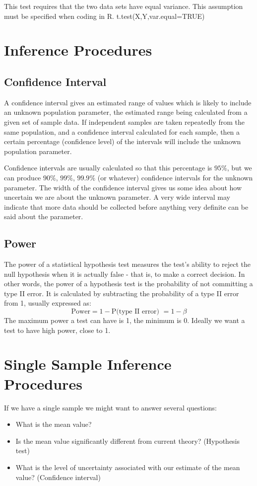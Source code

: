  
This test requires that the two data sets have equal variance. This assumption must be specified when coding in R.
t.test(X,Y,var.equal=TRUE)


 





\section{Inference Procedures}
\subsection{Confidence Interval }
A confidence interval gives an estimated range of values which is likely to include an unknown population parameter, the estimated range being calculated from a given set of sample data. If independent samples are taken repeatedly from the same population, and a confidence interval calculated for each sample, then a certain percentage (confidence level) of the intervals will include the unknown population parameter. 

Confidence intervals are usually calculated so that this percentage is $95\%$, but we can produce $90\%$, $99\%$, $99.9\%$ (or whatever) confidence intervals for the unknown parameter. The width of the confidence interval gives us some idea about how uncertain we are about the unknown parameter. A very wide interval may indicate that more data should be collected before anything very definite can be said about the parameter.
\subsection{Power }
 The power of a statistical hypothesis test measures the test's ability to reject the null hypothesis when it is actually false - that is, to make a correct decision. In other words, the power of a hypothesis test is the probability of not committing a type II error. It is calculated by subtracting the probability of a type II error from 1, usually expressed as: 
\[\mbox{Power} = 1 - \mbox{P(type II error) } = 1- \beta \]The maximum power a test can have is 1, the minimum is 0. Ideally we want a test to have high power, close to 1.

\section{Single Sample Inference Procedures}
If we have a single sample we might want to answer several
questions:
\begin{itemize}
\item What is the mean value? \item Is the mean value
significantly different from current theory? (Hypothesis test)
\item What is the level of uncertainty associated with our
estimate of the mean value? (Confidence interval)
\end{itemize}

